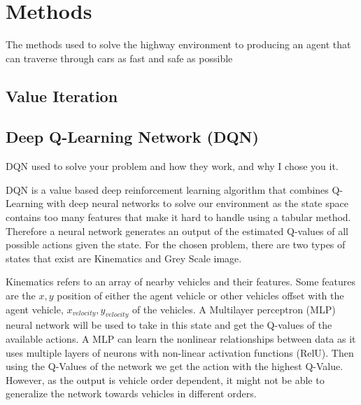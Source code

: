 \documentclass{article}
\begin{document}
\section{Methods}
The methods used to solve the highway environment to producing an agent that can traverse through cars as fast and safe as possible




\subsection{Value Iteration}
\subsection{Deep Q-Learning Network (DQN)}

DQN used to solve your problem and how they work, and why I chose you it.


DQN is a value based deep reinforcement learning algorithm that combines Q-Learning with deep neural networks to solve our environment as the state space contains too many features that make it hard to handle using a tabular method.
Therefore a neural network generates an output of the estimated Q-values of all possible actions given the state.
For the chosen problem, there are two types of states that exist are Kinematics and Grey Scale image.

Kinematics refers to an array of nearby vehicles and their features. Some features are the \(x, y\) position of either the agent vehicle or other vehicles offset with the agent vehicle, \(x_{velocity}, y_{velocity}\) of the vehicles.
A Multilayer perceptron (MLP) neural network will be used to take in this state and get the Q-values of the available actions.
A MLP can learn the nonlinear relationships between data as it uses multiple layers of neurons with non-linear activation functions (RelU).
Then using the Q-Values of the network we get the action with the highest Q-Value.
However, as the output is vehicle order dependent, it might not be able to generalize the network towards vehicles in different orders.
\end{document}
